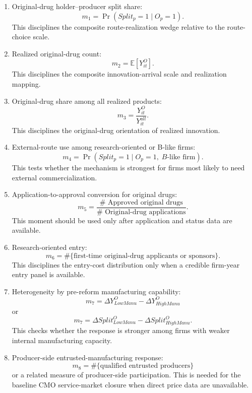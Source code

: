 \documentclass[12pt]{article}
\newcommand{\E}{\mathbb{E}}
\newcommand{\1}{\mathbf{1}}
\begin{document}
\begin{enumerate}
    \item Original-drug holder--producer split share:
    \[
        m_1=\Pr(Split_p=1\mid O_p=1).
    \]
    This disciplines the composite route-realization wedge relative to the route-choice scale.

    \item Realized original-drug count:
    \[
        m_2=\E[Y^O_{it}].
    \]
    This disciplines the composite innovation-arrival scale and realization mapping.

    \item Original-drug share among all realized products:
    \[
        m_3=\frac{Y^O_{it}}{Y^{all}_{it}}.
    \]
    This disciplines the original-drug orientation of realized innovation.

    \item External-route use among research-oriented or B-like firms:
    \[
        m_4=\Pr(Split_p=1\mid O_p=1,\;B\text{-like firm}).
    \]
    This tests whether the mechanism is strongest for firms most likely to need external commercialization.

    \item Application-to-approval conversion for original drugs:
    \[
        m_5=\frac{\#\text{ Approved original drugs}}{\#\text{ Original-drug applications}}.
    \]
    This moment should be used only after application and status data are available.

    \item Research-oriented entry:
    \[
        m_6=\#\{\text{first-time original-drug applicants or sponsors}\}.
    \]
    This disciplines the entry-cost distribution only when a credible firm-year entry panel is available.

    \item Heterogeneity by pre-reform manufacturing capability:
    \[
        m_7=\Delta Y^O_{LowManu}-\Delta Y^O_{HighManu}
    \]
    or
    \[
        m_7=\Delta Split^O_{LowManu}-\Delta Split^O_{HighManu}.
    \]
    This checks whether the response is stronger among firms with weaker internal manufacturing capacity.

    \item Producer-side entrusted-manufacturing response:
    \[
        m_8=\#\{\text{qualified entrusted producers}\}
    \]
    or a related measure of producer-side participation. This is needed for the baseline CMO service-market closure when direct price data are unavailable.
\end{enumerate}
\end{document}
